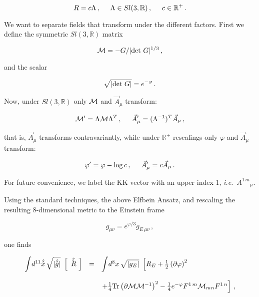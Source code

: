 \documentclass[12pt,a4paper]{article}
\begin{document}
\begin{equation}
R= c\Lambda \, ,
\hspace{.5cm}
\Lambda \in Sl(3,\mathbb{R})\, ,
\hspace{.5cm}
c\in \mathbb{R}^{+}\, .
\end{equation}

\noindent We want to separate fields that transform under the 
different factors.  First we define the symmetric $Sl(3,\mathbb{R})$
matrix

\begin{equation}
{\cal M} = -G/| {\rm det}\ G |^{1/3}\, ,
\label{eq:defM}\end{equation}

\noindent and the scalar

\begin{equation}
\sqrt{|{\rm det}\ G|}=e^{-\varphi}\, .
\end{equation}

\noindent Now, under $Sl(3,\mathbb{R})$ only ${\cal M}$ and $\vec{A}_{\mu}$
transform:

\begin{equation}
{\cal M}^{\prime} = \Lambda {\cal M} \Lambda^{T}\, ,  
\hspace{.5cm}
\vec{A}_{\mu}^{\prime} = (\Lambda^{-1})^{T}\vec{A}_{\mu}\, ,
\end{equation}

\noindent that is, $\vec{A}_{\mu}$ transforms contravariantly,
while under $\mathbb{R}^{+}$ rescalings only $\varphi$ and
$\vec{A}_{\mu}$ transform:

\begin{equation}
\varphi^{\prime} = \varphi -\log{c}\, ,
\hspace{.5cm}
\vec{A}_{\mu}^{\prime} = c \vec{A}_{\mu}\, .
\end{equation}

\noindent For future convenience, we label the KK vector with an upper 
index $1$, {\em i.e.}~$A^{1\, m}{}_{\mu}$.

Using the standard techniques, the above Elfbein Ansatz, and rescaling
the resulting 8-dimensional metric to the Einstein frame

\begin{equation}
\label{eq:masscale}
g_{\mu\nu} =e^{\varphi/3}g_{E\ \mu\nu}\, ,  
\end{equation}

\noindent one finds

\begin{equation}
\label{eq:curvature}
\begin{array}{rcl}
{\displaystyle\int} 
d^{11}\hat{\hat{x}}\, \sqrt{|\hat{\hat{g}}|}\ 
\left[\ \hat{\hat{R} \,}\ \right] & = & 
{\displaystyle\int} d^{8}x\, \sqrt{|g_{E}|}\
\left[
R_{E} +\frac{1}{2}\left(\partial\varphi \right)^{2}
\right.\\
& & \\
& & 
\left.
+{\textstyle\frac{1}{4}} {\rm Tr} 
\left(\partial {\cal M} {\cal M}^{-1}\right)^{2} 
-{\textstyle\frac{1}{4}} e^{-\varphi} 
F^{1\, m}{\cal M}_{mn}F^{1\, n}
\right]\, , 
\end{array}
\end{equation}
\end{document}
